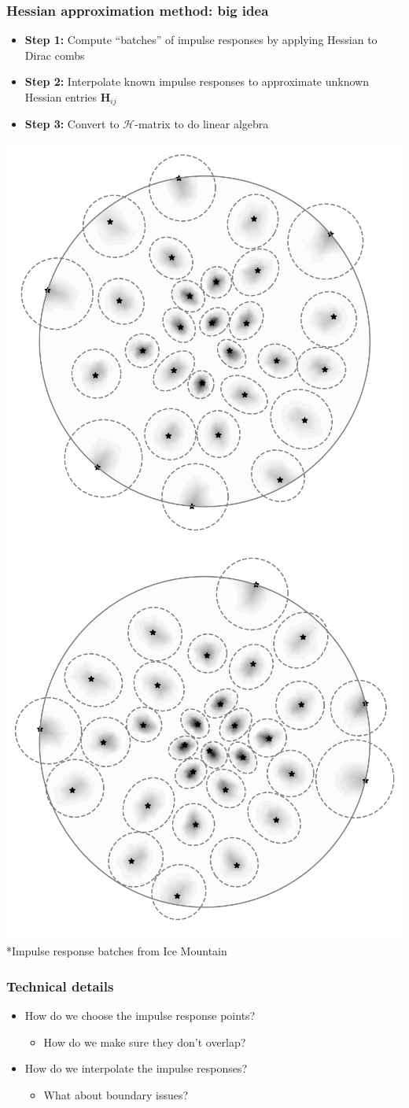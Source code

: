 \documentclass[10pt,final,xcolor=dvipsnames,aspect ratio=169]{beamer}
\begin{document}
\begin{frame}
	\frametitle{Hessian approximation method: big idea}
	\begin{itemize}
		\item {\bf Step 1:} Compute ``batches'' of impulse responses by applying Hessian to Dirac combs
		\item {\bf Step 2:} Interpolate known impulse responses to approximate unknown Hessian entries $\mathbf{H}_{ij}$
		\item {\bf Step 3:} Convert to $\mathcal{H}$-matrix to do linear algebra
	\end{itemize}
	\includegraphics[width=0.45\columnwidth]{impulse_batch1.png}  \includegraphics[width=0.45\columnwidth]{impulse_batch2.png}
	*Impulse response batches from Ice Mountain
\end{frame}
\begin{frame}
	\frametitle{Technical details}
	{\Large
		\begin{itemize}
			\setlength\itemsep{2em}
			\item How do we choose the impulse response points?
			\begin{itemize}
				\item {\large How do we make sure they don't overlap?}
			\end{itemize}
			\item How do we interpolate the impulse responses? 
			\begin{itemize}
				\item {\large What about boundary issues?}
			\end{itemize}
		\end{itemize}
	}
\end{frame}
\end{document}
